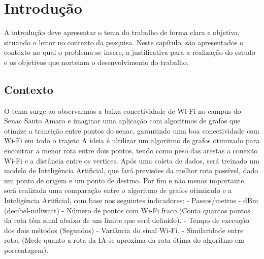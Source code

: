 \documentclass[
    12pt,                %
    openright,           %
    oneside,             %
    a4paper,             %
    english,             %
    brazil               %
]{abntex2}
\begin{document}
\textual

\chapter{Introdução}
\label{cap:introducao}

A introdução deve apresentar o tema do trabalho de forma clara e objetiva, situando o leitor no contexto da pesquisa. Neste capítulo, são apresentados o contexto no qual o problema se insere, a justificativa para a realização do estudo e os objetivos que norteiam o desenvolvimento do trabalho.

\section{Contexto}
\label{sec:contexto}



O tema surge ao observarmos a baixa conectividade de Wi-Fi no campus do Senac Santo Amaro e imaginar uma aplicação
 com algoritmos de grafos que otimize a transição entre pontos do senac, garantindo uma boa conectividade com 
 Wi-Fi em todo o trajeto
A ideia é ultilizar um algoritmo de grafos otimizado para encontrar a menor rota entre dois pontos, tendo como peso
das arestas a conexão Wi-Fi e a distância entre os vertices.
Após uma coleta de dados, será treinado um modelo de Inteligência Artificial, que fará previsões da melhor 
rota possível, dado um ponto de origem e um ponto de destino.
Por fim e não menos importante, será realizada uma comparação entre o algoritmo de grafos otimizado e a 
Inteligência Artificial, com base nos seguintes indicadores:\newline
- Passos/metros \newline
- dBm (decibel-miliwatt)\newline
- Número de pontos com Wi-Fi fraco \newline
(Conta quantos pontos da rota têm sinal abaixo de um limite que será definido).\newline
- Tempo de execução dos dois métodos (Segundos)\newline
- Variância do sinal Wi-Fi.\newline
- Similaridade entre rotas (Mede quanto a rota da IA se aproxima da rota ótima do algoritmo em porcentagem).\newline
\end{document}
